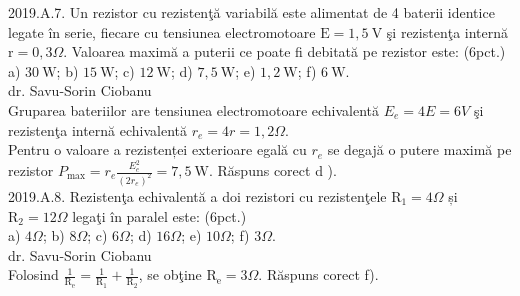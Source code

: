 2019.A.7. Un rezistor cu rezistenţă variabilă este alimentat de 4 baterii identice legate în serie, fiecare cu tensiunea electromotoare $\mathrm{E}=1,5 \mathrm{~V}$ şi rezistenţa internă $\mathrm{r}=0,3 \Omega$. Valoarea maximă a puterii ce poate fi debitată pe rezistor este: (6pct.)\\ a) $30 \mathrm{~W}$; b) $15 \mathrm{~W}$; c) $12 \mathrm{~W}$; d) $7,5 \mathrm{~W}$; e) $1,2 \mathrm{~W}$; f) $6 \mathrm{~W}$.\\ dr. Savu-Sorin Ciobanu\\ Gruparea bateriilor are tensiunea electromotoare echivalentă $E_{e}=4 E=6 V$ şi rezistenţa internă echivalentă $r_{e}=4 r=1,2 \Omega$.\\ Pentru o valoare a rezistenței exterioare egală cu $r_{e}$ se degajă o putere maximă pe rezistor $P_{\max}=r_{e} \frac{E_{e}^{2}}{\left(2 r_{e}\right)^{2}}=7,5 \mathrm{~W}$. Răspuns corect d ).\\

2019.A.8. Rezistenţa echivalentă a doi rezistori cu rezistenţele $\mathrm{R}_{1}=4 \Omega$ și $\mathrm{R}_{2}=12 \Omega$ legaţi în paralel este: (6pct.)\\ a) $4 \Omega$; b) $8 \Omega$; c) $6 \Omega$; d) $16 \Omega$; e) $10 \Omega$; f) $3 \Omega$.\\ dr. Savu-Sorin Ciobanu\\ Folosind $\frac{1}{\mathrm{R}_{\mathrm{e}}}=\frac{1}{\mathrm{R}_{1}}+\frac{1}{\mathrm{R}_{2}}$, se obţine $\mathrm{R}_{\mathrm{e}}=3 \Omega$. Răspuns corect f).\\

